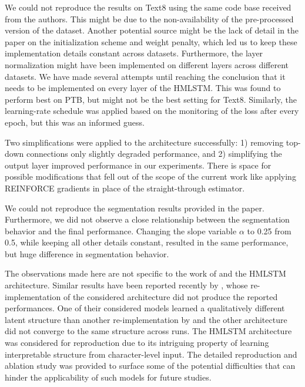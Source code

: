 We could not reproduce the results on Text8 using the same code base 
received from the authors. This might be due to the non-availability 
of the pre-processed version of the dataset. Another potential source 
might be the lack of detail in the paper on the initialization scheme 
and weight penalty, which led us to keep these implementation details 
constant across datasets. Furthermore, the layer normalization might 
have been implemented on different layers across different datasets. 
We have made several attempts until reaching the conclusion that it 
needs to be implemented on every layer of the HMLSTM. This was found 
to perform best on PTB, but might not be the best setting for Text8. 
Similarly, the learning-rate schedule was applied based on the monitoring 
of the loss after every epoch, but this was an informed guess. 

Two simplifications were applied to the architecture successfully: 
1) removing top-down connections only slightly degraded performance, and 
2) simplifying the output layer improved performance in our experiments. 
There is space for possible modifications that fell out of the scope 
of the current work like applying REINFORCE gradients in place of 
the straight-through estimator.   

We could not reproduce the segmentation results provided in the paper. 
Furthermore, we did not observe a close relationship between the segmentation 
behavior and the final performance. Changing the slope variable $\alpha$ 
to 0.25 from 0.5, while keeping all other details constant, resulted in the 
same performance, but huge difference in segmentation behavior.

The observations made here are not specific to the work of 
\cite{chung2016hierarchical} and the HMLSTM architecture. Similar results 
have been reported recently by \cite{williams2017learning}, whose 
re-implementation of the considered architecture did not produce the 
reported performances. One of their considered models learned a 
qualitatively different latent structure than another re-implementation 
by \cite{yogatama2016learning} and the other architecture did not converge 
to the same structure across runs. The HMLSTM architecture was considered 
for reproduction due to its intriguing property of learning interpretable 
structure from character-level input. The detailed reproduction and ablation 
study was provided to surface some of the potential difficulties that can 
hinder the applicability of such models for future studies. 


%
%
\clearpage


%

